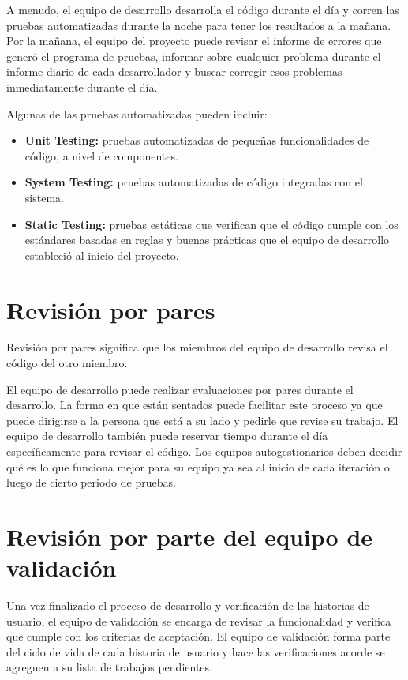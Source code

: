A menudo, el equipo de desarrollo desarrolla el código durante el día y corren las pruebas automatizadas durante la noche para tener los resultados a la mañana. Por la mañana, el equipo del proyecto puede revisar el informe de errores que generó el programa de pruebas, informar sobre cualquier problema durante el informe diario de cada desarrollador y buscar corregir esos problemas inmediatamente durante el día.

Algunas de las pruebas automatizadas pueden incluir:
\begin{itemize}
	\item \textbf{Unit Testing:} pruebas automatizadas de pequeñas funcionalidades de código, a nivel de componentes.
	\item \textbf{System Testing:} pruebas automatizadas de código integradas con el sistema.
	\item \textbf{Static Testing:} pruebas estáticas que verifican que el código cumple con los estándares basadas en reglas y buenas prácticas que el equipo de desarrollo estableció al inicio del proyecto.
\end{itemize}

\section{Revisión por pares}
Revisión por pares significa que los miembros del equipo de desarrollo revisa el código del otro miembro.

El equipo de desarrollo puede realizar evaluaciones por pares durante el desarrollo. La forma en que están sentados puede facilitar este proceso ya que puede dirigirse a la persona que está a su lado y pedirle que revise su trabajo. El equipo de desarrollo también puede reservar tiempo durante el día específicamente para revisar el código. Los equipos autogestionarios deben decidir qué es lo que funciona mejor para su equipo ya sea al inicio de cada iteración o luego de cierto periodo de pruebas.

\section{Revisión por parte del equipo de validación}
Una vez finalizado el proceso de desarrollo y verificación de las historias de usuario, el equipo de validación se encarga de revisar la funcionalidad y verifica que cumple con los criterias de aceptación. El equipo de validación forma parte del ciclo de vida de cada historia de usuario y hace las verificaciones acorde se agreguen a su lista de trabajos pendientes.

